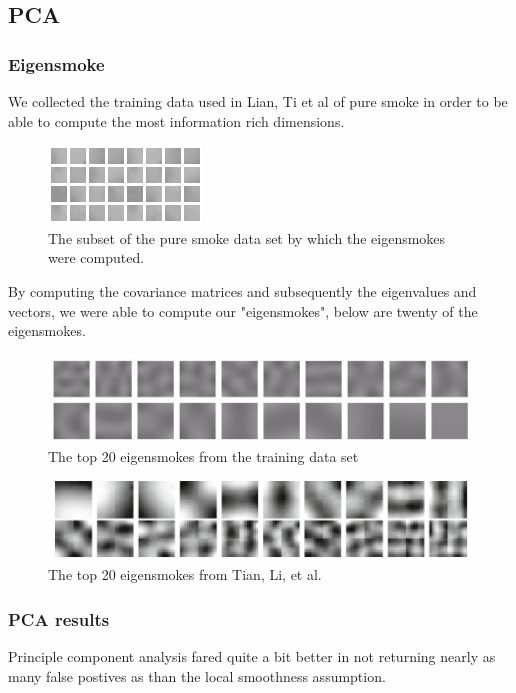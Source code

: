 \documentclass[12pt]{article}
\begin{document}
\subsection{PCA}

\subsubsection{Eigensmoke}
We collected the training data used in Lian, Ti et al of pure smoke in order to be able to compute the most information rich dimensions.  
\begin{figure}[H]
\centering
\includegraphics[scale=1]{train.jpg}
\caption{The subset of the pure smoke data set by which the eigensmokes were computed. }
\end{figure}
By computing the covariance matrices and subsequently the eigenvalues and vectors, we were able to compute our "eigensmokes", below are twenty of the eigensmokes.   
\begin{figure}[H]
\centering
\includegraphics[scale=.2]{Z.jpg}
\caption{The top 20 eigensmokes from the training data set}
\end{figure}

\begin{figure}[H]
\centering
\includegraphics[scale=.8]{papersEigen.png}
\caption{The top 20 eigensmokes from Tian, Li, et al.}

\end{figure}
\subsubsection{PCA results}
Principle component analysis fared quite a bit better in not returning nearly as many false postives as than the local smoothness assumption.  
\end{document}
